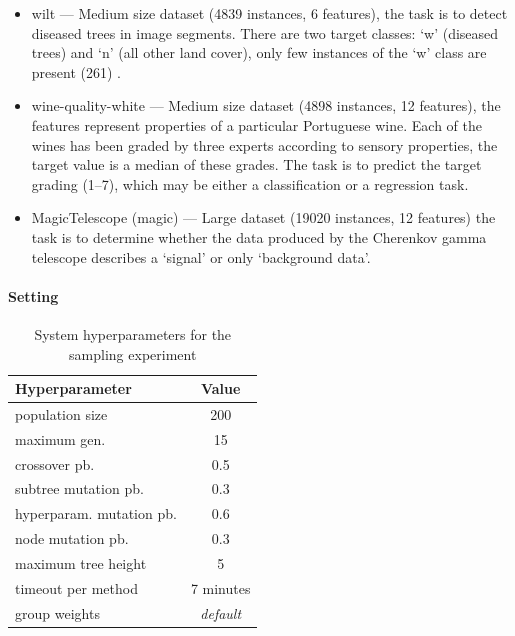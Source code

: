 \begin{itemize}
\item wilt --- Medium size dataset (4839 instances, 6 features), the task is to
detect diseased trees in image segments. There are two target classes: `w' (diseased
trees) and `n' (all other land cover), only few instances of the `w' class
are present (261) \citep{doi:10.1080/01431161.2013.810825}.
\item wine-quality-white --- Medium size dataset (4898 instances, 12 features),
the features represent properties of a particular Portuguese wine. Each of the
wines has been graded by three experts according to sensory properties, the
target value is a median of these grades. The task is to predict the target
grading (1--7), which may be either a classification or a regression task.
\citep{CORTEZ2009547}
\item MagicTelescope (magic) --- Large dataset (19020 instances, 12 features)
the task is to determine whether the data produced by the Cherenkov gamma
telescope describes a `signal' or only `background data'. \citep{BOCK2004511}
\end{itemize}

\paragraph{Setting}

\begin{table}[ht]

\centering
\caption{System hyperparameters for the sampling experiment}\label{tab04:exp1:setting}
\begin{tabular}{l c}
\toprule
\textbf{\upshape Hyperparameter} & \textbf{Value} \\
\midrule
population size & 200 \\
maximum gen. & 15 \\
crossover pb. & 0.5 \\
subtree mutation pb. & 0.3 \\
hyperparam. mutation pb. & 0.6 \\
node mutation pb. & 0.3 \\
maximum tree height & 5 \\
timeout per method  & 7 minutes \\
group weights & \textit{default} \\
\bottomrule

\end{tabular}

\end{table}

